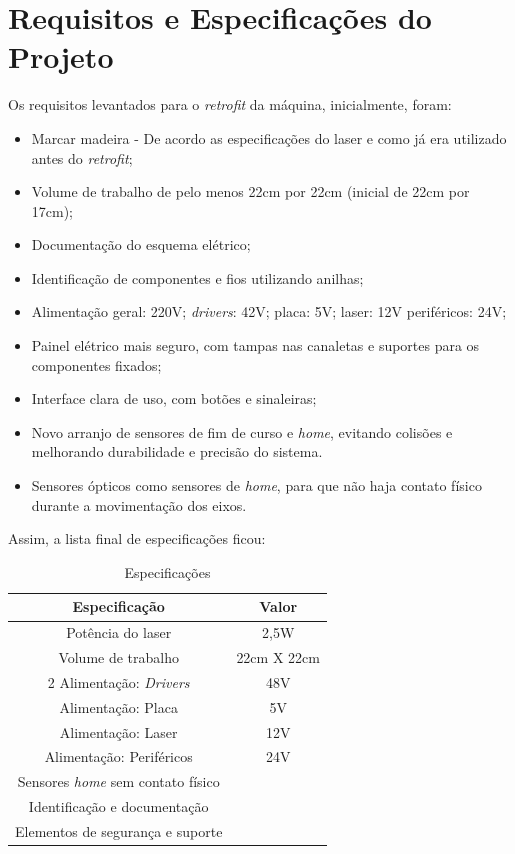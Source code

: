 \documentclass[
	article,			%
	11pt,				%
	oneside,			%
	a4paper,			%
	section=TITLE,		%
	english,			%
	brazil,				%
	sumario=tradicional
	]{abntex2}
\begin{document}
\section{Requisitos e Especificações do Projeto}
Os requisitos levantados para o \textit{retrofit} da máquina, inicialmente, foram:
\begin{itemize}
    \item Marcar madeira - De acordo as especificações do laser e como já era utilizado antes do \textit{retrofit};
    \item Volume de trabalho de pelo menos 22cm por 22cm (inicial de 22cm por 17cm);
    \item Documentação do esquema elétrico;
    \item Identificação de componentes e fios utilizando anilhas;
    \item Alimentação geral: 220V; \textit{drivers}: 42V; placa: 5V; laser: 12V periféricos: 24V;
    \item Painel elétrico mais seguro, com tampas nas canaletas e suportes para os componentes fixados;
    \item Interface clara de uso, com botões e sinaleiras;
    \item Novo arranjo de sensores de fim de curso e \textit{home}, evitando colisões e melhorando durabilidade e precisão do sistema.
    \item Sensores ópticos como sensores de \textit{home}, para que não haja contato físico durante a movimentação dos eixos.
\end{itemize}

Assim, a lista final de especificações ficou:

\begin{table}[H]
    \centering
    \begin{tabular}{c|c}
        \toprule
        Especificação & Valor \\
        \midrule
        Potência do laser & 2,5W \\
        Volume de trabalho & 22cm X 22cm\\2        Alimentação: \textit{Drivers} & 48V \\
        Alimentação: Placa & 5V \\
        Alimentação: Laser & 12V \\
        Alimentação: Periféricos & 24V \\
        Sensores \textit{home} sem contato físico & \\
        Identificação e documentação & \\
        Elementos de segurança e suporte & \\
        \bottomrule
     \end{tabular}
     \caption{Especificações}
     \label{tab:fontes}
 \end{table}
\end{document}
